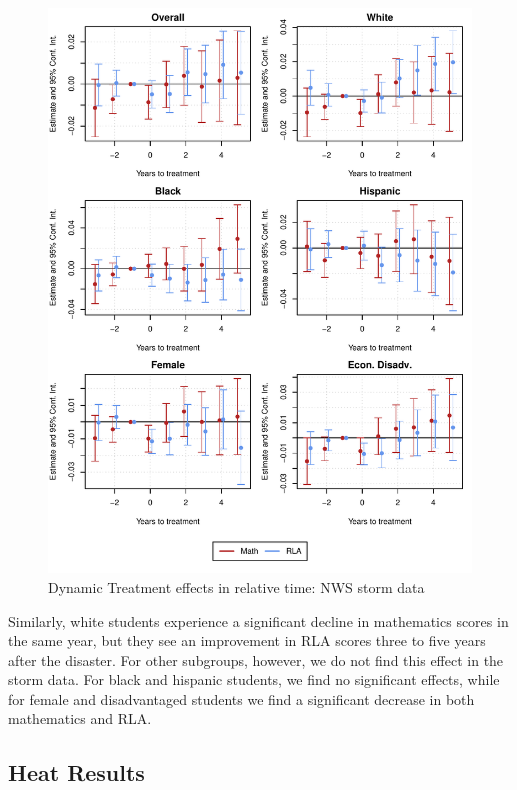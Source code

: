 \begin{figure}[!h]
	\centering
	\includegraphics[scale=1]{"../Code & Data/ResultsPlotStorm.pdf"}
	\caption{Dynamic Treatment effects in relative time: NWS storm data}
	\label{ResultsPlotStorm}
\end{figure}

Similarly, white students experience a significant decline in mathematics scores in the same year, but they see an improvement in RLA scores three to five years after the disaster. For other subgroups, however, we do not find this effect in the storm data. For black and hispanic students, we find no significant effects, while for female and disadvantaged students we find a significant decrease in both mathematics and RLA.

\subsection{Heat Results}

